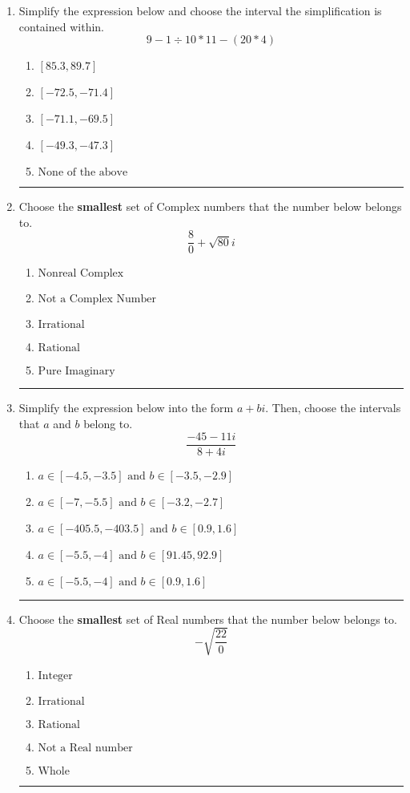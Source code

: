 \documentclass[14pt]{extbook}
\newcommand{\litem}[1]{\item#1\hspace*{-1cm}\rule{\textwidth}{0.4pt}}
\begin{document}
\begin{enumerate}
{\begin{enumerate}[label=\Alph*.]
\end{enumerate} }
\litem{
Simplify the expression below and choose the interval the simplification is contained within.\[ 9 - 1 \div 10 * 11 - (20 * 4) \]\begin{enumerate}[label=\Alph*.]
\item \( [85.3, 89.7] \)
\item \( [-72.5, -71.4] \)
\item \( [-71.1, -69.5] \)
\item \( [-49.3, -47.3] \)
\item \( \text{None of the above} \)

\end{enumerate} }
\litem{
Choose the \textbf{smallest} set of Complex numbers that the number below belongs to.\[ \frac{8}{0}+\sqrt{80} i \]\begin{enumerate}[label=\Alph*.]
\item \( \text{Nonreal Complex} \)
\item \( \text{Not a Complex Number} \)
\item \( \text{Irrational} \)
\item \( \text{Rational} \)
\item \( \text{Pure Imaginary} \)

\end{enumerate} }
\litem{
Simplify the expression below into the form $a+bi$. Then, choose the intervals that $a$ and $b$ belong to.\[ \frac{-45 - 11 i}{8 + 4 i} \]\begin{enumerate}[label=\Alph*.]
\item \( a \in [-4.5, -3.5] \text{ and } b \in [-3.5, -2.9] \)
\item \( a \in [-7, -5.5] \text{ and } b \in [-3.2, -2.7] \)
\item \( a \in [-405.5, -403.5] \text{ and } b \in [0.9, 1.6] \)
\item \( a \in [-5.5, -4] \text{ and } b \in [91.45, 92.9] \)
\item \( a \in [-5.5, -4] \text{ and } b \in [0.9, 1.6] \)

\end{enumerate} }
\litem{
Choose the \textbf{smallest} set of Real numbers that the number below belongs to.\[ -\sqrt{\frac{22}{0}} \]\begin{enumerate}[label=\Alph*.]
\item \( \text{Integer} \)
\item \( \text{Irrational} \)
\item \( \text{Rational} \)
\item \( \text{Not a Real number} \)
\item \( \text{Whole} \)


\end{enumerate}}
\end{enumerate}
\end{document}
